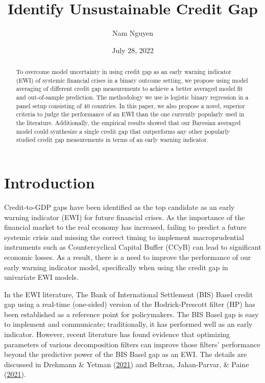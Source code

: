 \documentclass[
  12pt,
]{article}
\title{Identify Unsustainable Credit Gap}
\author{Nam Nguyen}
\date{July 28, 2022}
\begin{document}
\maketitle
\begin{abstract}
To overcome model uncertainty in using credit gap as an early warning indicator (EWI) of systemic financial crises in a binary outcome setting, we propose using model averaging of different credit gap measurements to achieve a better averaged model fit and out-of-sample prediction. The methodology we use is logistic binary regression in a panel setup consisting of 40 countries. In this paper, we also propose a novel, superior criteria to judge the performance of an EWI than the one currently popularly used in the literature. Additionally, the empirical results showed that our Bayesian averaged model could synthesize a single credit gap that outperforms any other popularly studied credit gap measurements in terms of an early warning indicator.
\end{abstract}

\hypertarget{introduction}{%
\section{Introduction}\label{introduction}}

Credit-to-GDP gaps have been identified as the top candidate as an early warning indicator (EWI) for future financial crises. As the importance of the financial market to the real economy has increased, failing to predict a future systemic crisis and missing the correct timing to implement macroprudential instruments such as Countercyclical Capital Buffer (CCyB) can lead to significant economic losses. As a result, there is a need to improve the performance of our early warning indicator model, specifically when using the credit gap in univariate EWI models.

In the EWI literature, The Bank of International Settlement (BIS) Basel credit gap using a real-time (one-sided) version of the Hodrick-Prescott filter (HP) has been established as a reference point for policymakers. The BIS Basel gap is easy to implement and communicate; traditionally, it has performed well as an early indicator. However, recent literature has found evidence that optimizing parameters of various decomposition filters can improve those filters' performance beyond the predictive power of the BIS Basel gap as an EWI. The details are discussed in Drehmann \& Yetman (\protect\hyperlink{ref-drehmann_which_2021}{2021}) and Beltran, Jahan-Parvar, \& Paine (\protect\hyperlink{ref-beltran_optimizing_2021}{2021}).
\end{document}
